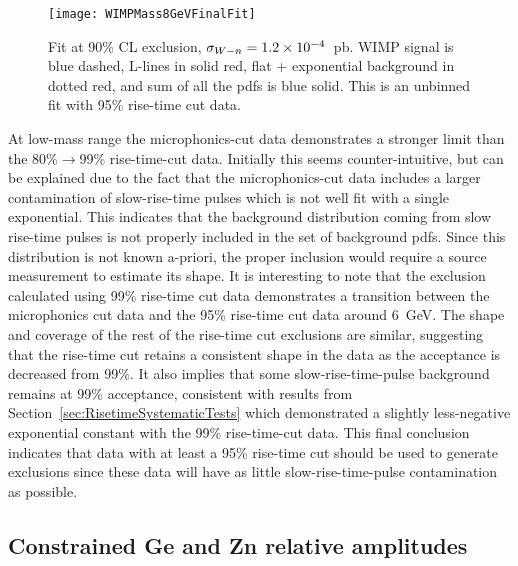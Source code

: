 			\begin{figure}
				\centering
				\texttt{[image: WIMPMass8GeVFinalFit]}
				\caption[Signal exclusion fit at 90\% CL.]
				{Fit at 90\% CL exclusion, $\sigma_{W-n} = 1.2 \times 10^{-4}$~pb.  
				WIMP signal is blue dashed, L-lines in solid red, flat + exponential background in dotted red, and 
				sum of all the pdfs is blue solid.
				This is an unbinned fit with 95\% rise-time cut data.  }
				\label{fig:WIMPFitExampleSigLikeBgd}
			\end{figure}

At low-mass range the microphonics-cut data demonstrates a stronger limit than the 80\%$\to$99\% rise-time-cut data.  Initially this seems counter-intuitive, but can be explained due to the fact that the microphonics-cut data includes a larger contamination of slow-rise-time pulses which is not well fit with a single exponential.  This indicates that the background distribution coming from slow rise-time pulses is not properly included in the set of background pdfs.  Since this distribution is not known a-priori, the proper inclusion would require a source measurement to estimate its shape.  It is interesting to note that the exclusion calculated using 99\% rise-time cut data demonstrates a transition between the microphonics cut data and the 95\% rise-time cut data around 6~GeV.  The shape and coverage of the rest of the rise-time cut exclusions are similar, suggesting that the rise-time cut retains a consistent shape in the data as the acceptance is decreased from 99\%.  It also implies that some slow-rise-time-pulse background remains at 99\% acceptance, consistent with results from Section~\ref{sec:RisetimeSystematicTests} which demonstrated a slightly less-negative exponential constant with the 99\% rise-time-cut data.  This final conclusion indicates that data with at least a 95\% rise-time cut should be used to generate exclusions since these data will have as little slow-rise-time-pulse contamination as possible.  

		\subsection{Constrained Ge and Zn relative amplitudes}
		\label{sec:LimitsConstrained}
	
